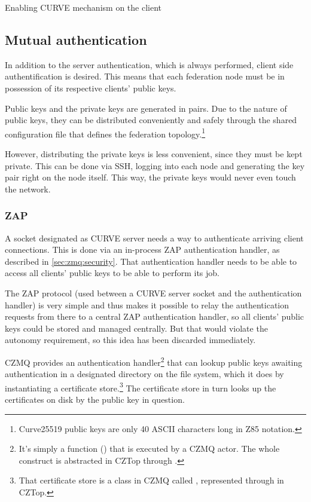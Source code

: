 \begin{listing}
	\inputminted[bgcolor=bg]{Ruby}{listings/auth/fednf.rb}
	\caption{Enabling CURVE mechanism on the client}
	\label{lst:auth:fednf}
\end{listing}

\subsection{Mutual authentication}
In addition to the server authentication, which is always performed, client
side authentification is desired. This means that each federation node must be
in possession of its respective clients' public keys.

Public keys and the private keys are generated in pairs.  Due to
the nature of public keys, they can be distributed conveniently and safely
through the shared configuration file that defines the federation
topology.\footnote{Curve25519 public keys are only 40 ASCII characters long in
\gls{Z85} notation.}

However, distributing the private keys is less convenient, since they must be kept
private. This can be done via \gls{SSH}, logging into each node and generating
the key pair right on the node itself. This way, the private keys would never
even touch the network.

\subsubsection{ZAP}
A socket designated as CURVE server needs a way to authenticate arriving client
connections. This is done via an in-process \gls{ZAP} authentication handler,
as described in \autoref{sec:zmq:security}. That authentication handler
needs to be able to access all clients' public keys to be able to perform its
job.

The ZAP protocol (used between a CURVE server socket and the authentication
handler) is very simple and thus makes it possible to relay the authentication
requests from there to a central ZAP authentication handler, so all clients'
public keys could be stored and managed centrally. But that would violate the
autonomy requirement, so this idea has been discarded immediately.

CZMQ provides an authentication handler\footnote{It's simply a function
() that is executed by a CZMQ actor. The whole construct is
abstracted in CZTop through .} that can lookup public
keys awaiting authentication in a designated directory on the file system,
which it does by instantiating a certificate store.\footnote{That certificate
store is a class in CZMQ called , represented through
 in CZTop.} The certificate store in turn looks up the
certificates on disk by the public key in question.

